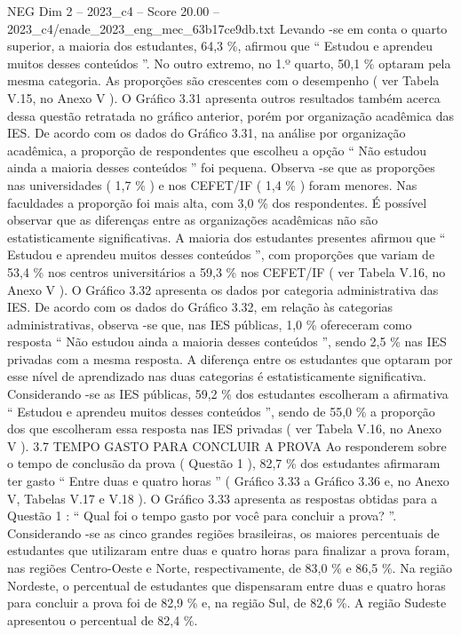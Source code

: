 \begin{textsample}{NEG Dim 2 – 2023\_c4 – Score 20.00 – 2023\_c4/enade\_2023\_eng\_mec\_63b17ce9db.txt}
Levando -se em conta o quarto superior, a maioria dos estudantes, 64,3 \%, afirmou que “ Estudou e aprendeu muitos desses conteúdos ”.
No outro extremo, no 1.º quarto, 50,1 \% optaram pela mesma categoria.
As proporções são crescentes com o desempenho ( ver Tabela V.15, no Anexo V ).
O Gráfico 3.31 apresenta outros resultados também acerca dessa questão retratada no gráfico anterior, porém por organização acadêmica das IES.
De acordo com os dados do Gráfico 3.31, na análise por organização acadêmica, a proporção de respondentes que escolheu a opção “ Não estudou ainda a maioria desses conteúdos ” foi pequena.
Observa -se que as proporções nas universidades ( 1,7 \% ) e nos CEFET/IF ( 1,4 \% ) foram menores.
Nas faculdades a proporção foi mais alta, com 3,0 \% dos respondentes.
É possível observar que as diferenças entre as organizações acadêmicas não são estatisticamente significativas.
A maioria dos estudantes presentes afirmou que “ Estudou e aprendeu muitos desses conteúdos ”, com proporções que variam de 53,4 \% nos centros universitários a 59,3 \% nos CEFET/IF ( ver Tabela V.16, no Anexo V ).
O Gráfico 3.32 apresenta os dados por categoria administrativa das IES.
De acordo com os dados do Gráfico 3.32, em relação às categorias administrativas, observa -se que, nas IES públicas, 1,0 \% ofereceram como resposta “ Não estudou ainda a maioria desses conteúdos ”, sendo 2,5 \% nas IES privadas com a mesma resposta.
A diferença entre os estudantes que optaram por esse nível de aprendizado nas duas categorias é estatisticamente significativa.
Considerando -se as IES públicas, 59,2 \% dos estudantes escolheram a afirmativa “ Estudou e aprendeu muitos desses conteúdos ”, sendo de 55,0 \% a proporção dos que escolheram essa resposta nas IES privadas ( ver Tabela V.16, no Anexo V ). 3.7 TEMPO GASTO PARA CONCLUIR A PROVA Ao responderem sobre o tempo de conclusão da prova ( Questão 1 ), 82,7 \% dos estudantes afirmaram ter gasto “ Entre duas e quatro horas ” ( Gráfico 3.33 a Gráfico 3.36 e, no Anexo V, Tabelas V.17 e V.18 ).
O Gráfico 3.33 apresenta as respostas obtidas para a Questão 1 : “ Qual foi o tempo gasto por você para concluir a prova? ”.
Considerando -se as cinco grandes regiões brasileiras, os maiores percentuais de estudantes que utilizaram entre duas e quatro horas para finalizar a prova foram, nas regiões Centro-Oeste e Norte, respectivamente, de 83,0 \% e 86,5 \%.
Na região Nordeste, o percentual de estudantes que dispensaram entre duas e quatro horas para concluir a prova foi de 82,9 \% e, na região Sul, de 82,6 \%.
A região Sudeste apresentou o percentual de 82,4 \%.

\end{textsample}
